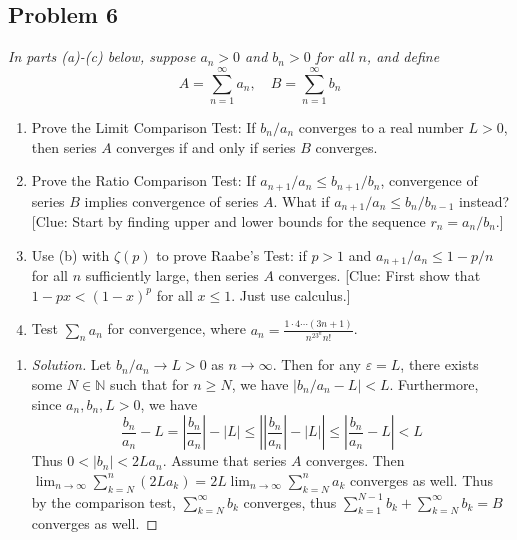 \documentclass{article}
\newcommand{\N}{{\mathbb N}}
\newcommand{\ep}{{\varepsilon}}
\begin{document}
\subsection*{Problem 6}
{\it In parts (a)-(c) below, suppose $a_n > 0$ and $b_n > 0$ for all $n$, and define
\[
	A = \sum_{n=1}^\infty a_n, \quad B = \sum_{n=1}^\infty b_n
\]
\begin{enumerate}
	\item Prove the Limit Comparison Test:
		If $b_n/a_n$ converges to a real number $L > 0$,
		then series $A$ converges if and only if series $B$ converges.
	\item Prove the Ratio Comparison Test:
		If $a_{n+1}/a_n \leq b_{n+1}/b_n$, convergence of series $B$
		implies convergence of series $A$.
		What if $a_{n+1}/a_n \leq b_n/b_{n-1}$ instead?
		[Clue: Start by finding upper and lower bounds for the sequence $r_n = a_n/b_n$.]
	\item Use (b) with $\zeta(p)$ to prove Raabe's Test:
		if $p > 1$ and $a_{n+1}/a_n \leq 1 - p/n$ for all $n$ sufficiently large,
		then series $A$ converges.
		[Clue: First show that $1-px < (1-x)^p$ for all $x \leq 1$. Just use calculus.]
	\item Test $\sum_n a_n$ for convergence,
		where $a_n = \frac{1\cdot 4 \cdots (3n+1)}{n^23^nn!}$.
\end{enumerate}

\begin{enumerate}
	\item \begin{proof}[Solution]\let\qed\relax
		Let $b_n/a_n \to L > 0$ as $n \to \infty$.
		Then for any $\ep = L$,
		there exists some $N \in \N$ such that for $n \geq N$,
		we have $|b_n/a_n - L| < L$.
		Furthermore, since $a_n,b_n,L > 0$, we have
		\[
			\frac{b_n}{a_n} - L = \left\lvert\frac{b_n}{a_n}\right\rvert - |L|
			\leq \left\lvert\left\lvert\frac{b_n}{a_n}\right\rvert - |L|\right\rvert
			\leq \left\lvert \frac{b_n}{a_n} - L \right\rvert  < L
		\]
		Thus $0 < |b_n| < 2La_n$.
		Assume that series $A$ converges.
		Then $\lim_{n \to \infty} \sum_{k=N}^n (2La_k) = 2L\lim_{n \to \infty} \sum_{k=N}^n a_k$
		converges as well.
		Thus by the comparison test,
		$\sum_{k=N}^\infty b_k$ converges,
		thus $\sum_{k=1}^{N-1}b_k + \sum_{k=N}^\infty b_k = B$
		converges as well.


\end{proof}
\end{enumerate}}
\end{document}
